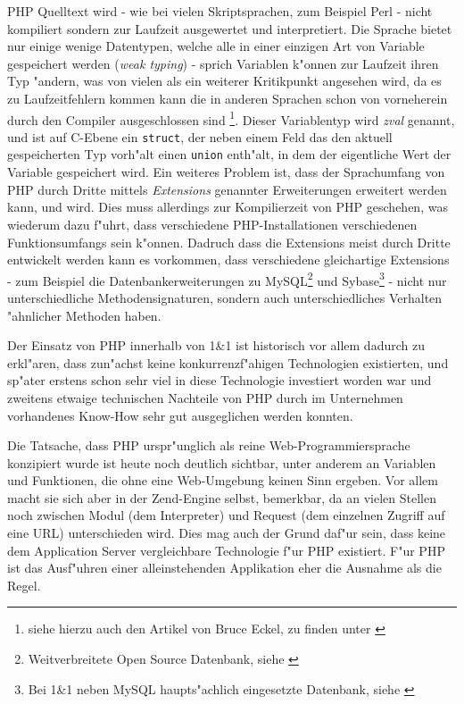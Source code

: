 PHP Quelltext wird - wie bei vielen Skriptsprachen, zum Beispiel Perl - nicht kompiliert sondern zur Laufzeit ausgewertet und interpretiert.
Die Sprache bietet nur einige wenige Datentypen, welche alle in einer einzigen Art von Variable gespeichert werden
(\emph{weak typing}) - sprich Variablen k"onnen zur Laufzeit ihren Typ "andern, 
was von vielen als ein weiterer Kritikpunkt angesehen wird, da es zu Laufzeitfehlern kommen kann die in anderen 
Sprachen schon von vorneherein durch den Compiler ausgeschlossen sind
\footnote{
siehe hierzu auch den Artikel von Bruce Eckel, zu finden unter \cite{TYPING}
}.
Dieser Variablentyp wird \emph{zval} genannt, und ist auf C-Ebene ein \texttt{struct}, der neben einem Feld das den aktuell 
gespeicherten Typ vorh"alt einen \texttt{union} enth"alt, in dem der eigentliche Wert der Variable gespeichert wird.
Ein weiteres Problem ist, dass der Sprachumfang von PHP durch Dritte mittels \emph{Extensions}
genannter Erweiterungen erweitert werden kann, und wird. Dies muss allerdings zur Kompilierzeit von PHP geschehen, was wiederum
dazu f"uhrt, dass verschiedene PHP-Installationen verschiedenen Funktionsumfangs sein k"onnen. 
Dadruch dass die Extensions meist durch Dritte entwickelt werden kann es vorkommen, dass
verschiedene gleichartige Extensions - zum Beispiel die Datenbankerweiterungen zu MySQL\footnote{
Weitverbreitete Open Source Datenbank, siehe \cite{MySQL}} und Sybase\footnote{
Bei 1\&1 neben MySQL haupts"achlich eingesetzte Datenbank, siehe \cite{SYBASE}} - nicht
nur unterschiedliche Methodensignaturen, sondern auch unterschiedliches Verhalten "ahnlicher Methoden haben.

Der Einsatz von PHP innerhalb von 1\&1 ist historisch vor allem dadurch zu erkl"aren, dass zun"achst keine 
konkurrenzf"ahigen Technologien existierten, und sp"ater erstens schon sehr viel in diese Technologie investiert
worden war und zweitens etwaige technischen Nachteile von PHP durch im Unternehmen vorhandenes Know-How sehr gut
ausgeglichen werden konnten.

Die Tatsache, dass PHP urspr"unglich als reine Web-Programmiersprache konzipiert wurde ist heute noch deutlich sichtbar, 
unter anderem an 
Variablen und Funktionen, die ohne eine Web-Umgebung keinen Sinn ergeben. Vor allem macht sie sich aber in der Zend-Engine selbst,
bemerkbar, da
an vielen Stellen noch zwischen Modul (dem Interpreter) und Request (dem einzelnen Zugriff auf eine URL) unterschieden
wird. Dies mag auch der Grund daf"ur sein, dass keine dem Application Server vergleichbare Technologie f"ur PHP existiert.
F"ur PHP ist das Ausf"uhren einer alleinstehenden Applikation eher die Ausnahme als die Regel.

